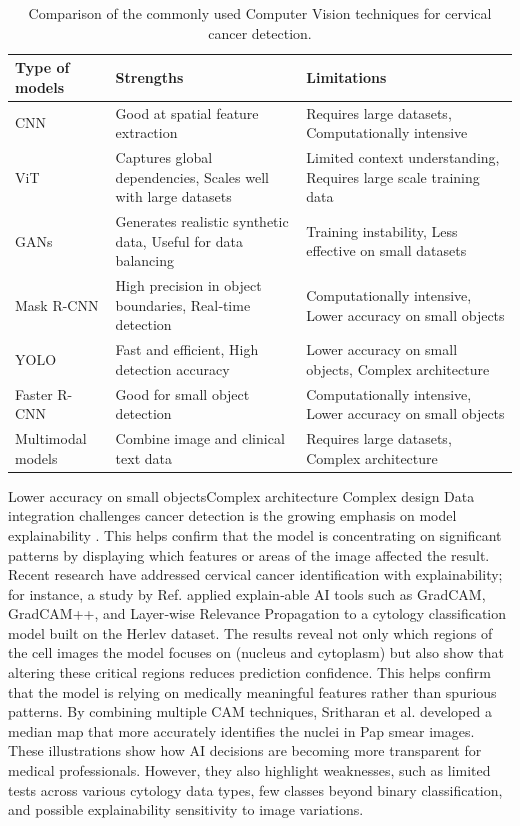 \documentclass[final,5p,times,twocolumn,authoryear]{elsarticle}
\begin{document}
\begin{table}
\centering
\caption{Comparison of the commonly used Computer Vision techniques for cervical cancer detection.}
\label{tab:cv-techniques}
\begin{tabular}{|l|p{5.5cm}|p{5.5cm}|}
\hline
\textbf{Type of models} & \textbf{Strengths} & \textbf{Limitations} \\
\hline
CNN & Good at spatial feature extraction & Requires large datasets, Computationally intensive \\
\hline
ViT & Captures global dependencies, Scales well with large datasets & Limited context understanding, Requires large scale training data \\
\hline
GANs & Generates realistic synthetic data, Useful for data balancing & Training instability, Less effective on small datasets \\
\hline
Mask R-CNN & High precision in object boundaries, Real‑time detection & Computationally intensive, Lower accuracy on small objects \\
\hline
YOLO & Fast and efficient, High detection accuracy & Lower accuracy on small objects, Complex architecture \\
\hline
Faster R-CNN & Good for small object detection & Computationally intensive, Lower accuracy on small objects \\
\hline
Multimodal models & Combine image and clinical text data & Requires large datasets, Complex architecture \\
\hline
\end{tabular}
\end{table}

Lower accuracy on small objectsComplex architecture
Complex design Data integration challenges
cancer detection is the growing emphasis on model explainability \cite{ref153}. This helps confirm that the model is concentrating on significant patterns by displaying which features or areas of the image affected the result. Recent research have addressed cervical cancer identification with explainability; for instance, a study by Ref. \cite{ref154} applied explain‑able AI tools such as GradCAM, GradCAM++, and Layer‑wise Relevance Propagation to a cytology classification model built on the Herlev dataset. The results reveal not only which regions of the cell images the model focuses on (nucleus and cytoplasm) but also show that altering these critical regions reduces prediction confidence. This helps confirm that the model is relying on medically meaningful features rather than spurious patterns. By combining multiple CAM techniques, Sritharan et al. \cite{ref155} developed a median map that more accurately identifies the nuclei in Pap smear images. These illustrations show how AI decisions are becoming more transparent for medical professionals. However, they also highlight weaknesses, such as limited tests across various cytology data types, few classes beyond binary classification, and possible explainability sensitivity to image variations.
\end{document}
